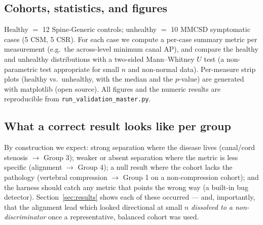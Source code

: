 \subsection{Cohorts, statistics, and figures}
Healthy $=$ 12 Spine-Generic controls; unhealthy $=$ 10 MMCSD symptomatic cases (5 CSM, 5 CSR). For each
case we compute a per-case summary metric per measurement (e.g.\ the across-level minimum canal AP), and
compare the healthy and unhealthy distributions with a two-sided Mann--Whitney $U$ test (a
non-parametric test appropriate for small $n$ and non-normal data). Per-measure strip plots (healthy vs.\
unhealthy, with the median and the $p$-value) are generated with matplotlib (open source). All figures and
the numeric results are reproducible from \texttt{run\_validation\_master.py}.

\subsection{What a correct result looks like per group}
By construction we expect: strong separation where the disease lives (canal/cord stenosis $\rightarrow$
Group 3); weaker or absent separation where the metric is less specific (alignment $\rightarrow$ Group 4);
a null result where the cohort lacks the pathology (vertebral compression $\rightarrow$ Group 1 on a
non-compression cohort); and the harness should catch any metric that points the wrong way (a built-in
bug detector). Section~\ref{sec:results} shows each of these occurred --- and, importantly, that the
alignment lead which looked directional at small $n$ \emph{dissolved to a non-discriminator} once a
representative, balanced cohort was used.
